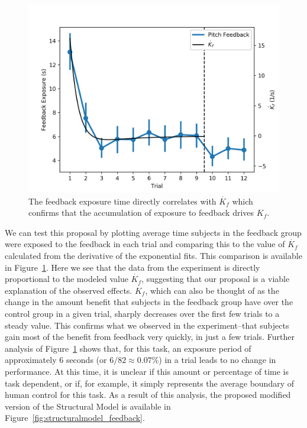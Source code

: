 \begin{figure}[tb]
    \centering
    \includegraphics[width=0.8\linewidth]{figures/Modeling/f_v_kfd.png}
    \caption[The feedback exposure time directly correlates with $\dot{K_{f}}$]{The feedback exposure time directly correlates with $\dot{K_{f}}$ which confirms that the accumulation of exposure to feedback drives $K_f$.}
    \label{fig:feedback_kfd}
\end{figure}

We can test this proposal by plotting average time subjects in the feedback group were exposed to the feedback in each trial and comparing this to the value of $\dot{K_f}$ calculated from the derivative of the exponential fits.
This comparison is available in Figure~\ref{fig:feedback_kfd}.
Here we see that the data from the experiment is directly proportional to the modeled value $\dot{K_f}$, suggesting that our proposal is a viable explanation of the observed effects.
$\dot{K_f}$, which can also be thought of as the change in the amount benefit that subjects in the feedback group have over the control group in a given trial, sharply decreases over the first few trials to a steady value.
This confirms what we observed in the experiment--that subjects gain most of the benefit from feedback very quickly, in just a few trials.
Further analysis of Figure~\ref{fig:feedback_kfd} shows that, for this task, an exposure period of approximately 6 seconds (or $6/82\approx0.07\%$) in a trial leads to no change in performance.
At this time, it is unclear if this amount or percentage of time is task dependent, or if, for example, it simply represents the average boundary of human control for this task.
As a result of this analysis, the proposed modified version of the Structural Model is available in Figure~\ref{fig:structuralmodel_feedback}.

